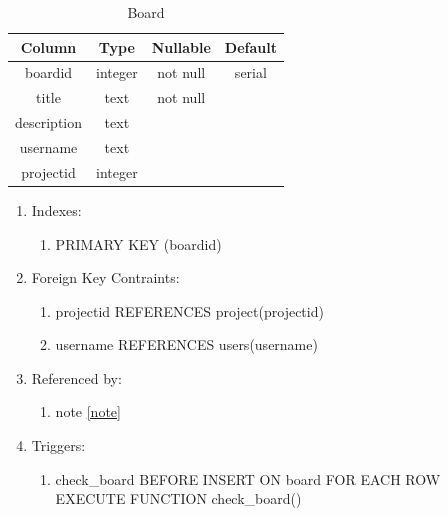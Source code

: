 \documentclass[conference,onecolumn]{IEEEtran}
\begin{document}
\begin{table}[htbp]
  \caption{Board}
  \begin{center}
    \begin{tabular}{|c|c|c|c|}
      \hline
      \textbf{Column} & \textbf{Type} & \textbf{Nullable} & \textbf{Default}\\
      \hline
      boardid & integer & not null & serial\\
      title & text & not null &\\
      description & text &&\\
      username & text &&\\
      projectid & integer &&\\
      \hline
    \end{tabular}
    \begin{enumerate}
    \item Indexes:
      \begin{enumerate}
      \item PRIMARY KEY (boardid)
      \end{enumerate}
    \item Foreign Key Contraints:
      \begin{enumerate}
      \item projectid REFERENCES project(projectid)
      \item username REFERENCES users(username)
      \end{enumerate}
    \item Referenced by:
      \begin{enumerate}
        \item note \ref{note}
      \end{enumerate}
    \item Triggers:
      \begin{enumerate}
        \item check\_board BEFORE INSERT ON board FOR EACH ROW EXECUTE FUNCTION check\_board()
      \end{enumerate}
    \end{enumerate}
    \label{board}
  \end{center}
\end{table}
\end{document}
